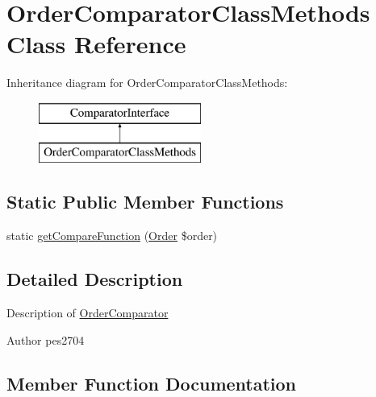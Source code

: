 \hypertarget{class_pes_1_1_comparator_1_1_order_comparator_class_methods}{}\section{Order\+Comparator\+Class\+Methods Class Reference}
\label{class_pes_1_1_comparator_1_1_order_comparator_class_methods}
Inheritance diagram for Order\+Comparator\+Class\+Methods\+:\begin{figure}[H]
\begin{center}
\leavevmode
\includegraphics[height=2.000000cm]{class_pes_1_1_comparator_1_1_order_comparator_class_methods}
\end{center}
\end{figure}
\subsection*{Static Public Member Functions}
\begin{DoxyCompactItemize}
\item 
static \mbox{\hyperlink{class_pes_1_1_comparator_1_1_order_comparator_class_methods_a21aeb75d37fce6724b5a60f836dfc85c}{get\+Compare\+Function}} (\mbox{\hyperlink{class_pes_1_1_query_1_1_order}{Order}} \$order)
\end{DoxyCompactItemize}


\subsection{Detailed Description}
Description of \mbox{\hyperlink{class_pes_1_1_comparator_1_1_order_comparator}{Order\+Comparator}}

\begin{DoxyAuthor}{Author}
pes2704 
\end{DoxyAuthor}


\subsection{Member Function Documentation}
\mbox{\label{class_pes_1_1_comparator_1_1_order_comparator_class_methods_a21aeb75d37fce6724b5a60f836dfc85c}} 
